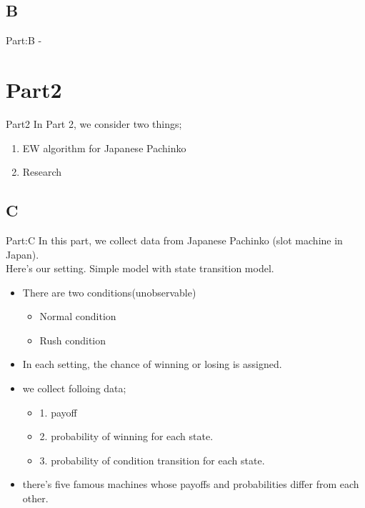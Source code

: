 \documentclass{beamer}
\begin{document}
\subsection{B}
\begin{frame}{Part:B - }
    
\end{frame}


\section{Part2}
\begin{frame}{Part2}
In Part 2, we consider two things;
\begin{enumerate}
    \item EW algorithm for Japanese Pachinko
    \item Research 
\end{enumerate}
    
\end{frame}
\subsection{C}
\begin{frame}{Part:C}
In this part, we collect data from Japanese Pachinko (slot machine in Japan).\\
Here's our setting. Simple model with state transition model.
\begin{itemize}
    \item There are two conditions(unobservable)
    \begin{itemize}
        \item Normal condition
        \item Rush condition
    \end{itemize}
    \item In each setting, the chance of winning or losing is assigned.
\end{itemize}
\begin{itemize}
    \item we collect folloing data; 
    \begin{itemize}
        \item 1. payoff
        \item 2. probability of winning for each state.
        \item 3. probability of condition transition for each state.
    \end{itemize}
    \item there's five famous machines whose payoffs and probabilities differ from each other.
\end{itemize}
\end{frame}
\end{document}
